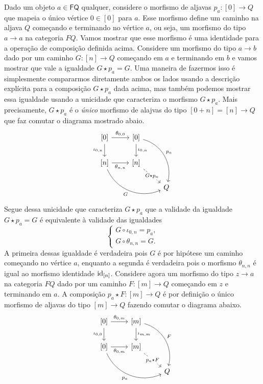 Dado um objeto $a \in \mathsf{FQ}$ qualquer, considere o morfismo de aljavas $p_a: [0] \to Q$ que mapeia o único vértice $0 \in [0]$ para $a$.
Esse morfismo define um caminho na aljava $Q$ começando e terminando no vértice $a$, ou seja, um morfismo do tipo $a \to a$ na categoria $FQ$.
Vamos mostrar que esse morfismo é uma identidade para a operação de composição definida acima.
Considere um morfismo do tipo $a \to b$ dado por um caminho $G:[n] \to Q$ começando em $a$ e terminando em $b$ e vamos mostrar que vale a igualdade $G \star p_a = G$.
Uma maneira de fazermos isso é simplesmente compararmos diretamente ambos os lados usando a descrição explícita para a composição $G \star p_a$ dada acima, mas também podemos mostrar essa igualdade usando a unicidade que caracteriza o morfismo $G \star p_a$.
Mais precisamente, $G \star p_a$ é o \emph{único} morfismo de alajvas do tipo $[0+n] = [n] \to Q$ que faz comutar o diagrama mostrado abaio.
\begin{displaymath}
    \begin{tikzcd}
        {[0]}
        \arrow[r, "{\theta_{0,0}}"]
        \arrow[d, "{\iota_{0,n}}" swap]
        & {[0]}
        \arrow[d, "\iota_{0,n}"]
        \arrow[rdd, bend left=45, "p_a"]
        \\ {[n]}
        \arrow[r, "{\theta_{n,n}}" swap]
        \arrow[rrd, bend right=45, "G" swap]
        & {[n]}
        \arrow[rd, dashed, "G \star p_a" description]
        \\ & & Q
    \end{tikzcd}
\end{displaymath}
Segue dessa unicidade que caracteriza $G \star p_a$ que a validade da igualdade $G \star p_a = G$ é equivalente à validade das igualdades
\begin{displaymath}
    \begin{cases}
        G \circ \iota_{0,n} = p_a, \\
        G \circ \theta_{n,n} = G.
    \end{cases}
\end{displaymath}
A primeira dessas igualdade é verdadeira pois $G$ é por hipótese um caminho começando no vértice $a$, enquanto a segunda é verdadeira pois o morfismo $\theta_{n,n}$ é igual ao morfismo identidade $\mathrm{id}_{[n]}$.
Considere agora um morfismo do tipo $z \to a$ na categoria $FQ$ dado por um caminho $F:[m] \to Q$ começando em $z$ e terminando em $a$.
A composição $p_a \star F: [m] \to Q$ é por definição o único morfismo de aljavas do tipo $[m] \to Q$ fazendo comutar o diagrama abaixo.
\begin{displaymath}
    \begin{tikzcd}
        {[0]}
        \arrow[r, "{\theta_{0,m}}"]
        \arrow[d, "{\iota_{0,0}}" swap]
        & {[m]}
        \arrow[d, "\iota_{m,m}"]
        \arrow[rdd, bend left=45, "F"]
        \\ {[0]}
        \arrow[r, "{\theta_{0,m}}" swap]
        \arrow[rrd, bend right=45, "p_a" swap]
        & {[m]}
        \arrow[rd, dashed, "p_a \star F" description]
        \\ & & Q
    \end{tikzcd}
\end{displaymath}
